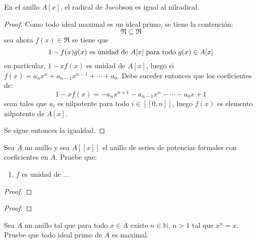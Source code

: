 \documentclass[12pt]{report}
\newcounter{it}
\theoremstyle{largebreak}
\newcommand\natint[1]{\ensuremath{\left[\!\left[ #1\right]\!\right]}}
\begin{document}
    \begin{excer}
        En el anillo $A[x]$, el radical de Jacobson es igual al nilradical.
    \end{excer}

    \begin{proof}
        Como todo ideal maximal es un ideal primo, se tiene la contención:
        \begin{equation*}
            \mathfrak{N}\subseteq\mathfrak{R}
        \end{equation*}
        sea ahora $f(x)\in \mathfrak{R}$ se tiene que
        \begin{equation*}
            1-f(x)g(x) \textup{ es unidad de $A[x]$ para todo }g(x)\in A[x]
        \end{equation*}
        en particular, $1-xf(x)$ es unidad de $A[x]$, luego si $f(x)=a_nx^n+a_{ n-1}x^{ n-1}+\cdots+a_0$. Debe suceder entonces que los coeficientes de:
        \begin{equation*}
            1-xf(x)=-a_nx^{n+1}-a_{ n-1}x^{ n}-\cdots-a_0x+1
        \end{equation*}
        sean tales que $a_i$ es nilpotente para todo $i\in\natint{0,n}$, luego $f(x)$ es elemento nilpotente de $A[x]$.

        Se sigue entonces la igualdad.
    \end{proof}

    \begin{excer}
        Sea $A$ un anillo y sea $A[[x]]$ el anillo de series de potencias formales con coeficientes en $A$. Pruebe que:
        \begin{enumerate}[label =\textit{\arabic*}]
            \item $f$ es unidad de ...%
        \end{enumerate}
    \end{excer}
    
    \begin{proof}
        
    \end{proof}

    \begin{excer}
        
    \end{excer}

    \begin{proof}
        
    \end{proof}

    \begin{excer}
        Sea $A$ un anillo tal que para todo $x\in A$ existe $n\in\mathbb{N}$, $n>1$ tal que $x^n=x$. Pruebe que todo ideal primo de $A$ es maximal.
    \end{excer}
\end{document}
